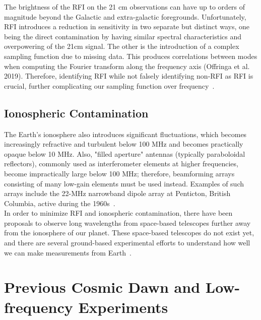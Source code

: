 \documentclass[12pt,a4paper]{report}
\begin{document}
	The brightness of the RFI on the 21 cm observations can have up to orders of magnitude beyond the Galactic and extra-galactic foregrounds. Unfortunately, RFI introduces a reduction in sensitivity in two separate but distinct ways, one being the direct contamination by having similar spectral characteristics and overpowering of the 21cm signal. The other is the introduction of a complex sampling function due to missing data. This produces correlations between modes when computing the Fourier transform along the frequency axis (Offringa et al. 2019). Therefore,  identifying RFI while not falsely identifying non-RFI as RFI is crucial, further complicating our sampling function over frequency~\citep{2019MNRAS.488.2605K}.
		
	\subsection*{Ionospheric Contamination}
	
	The Earth's ionosphere also introduces significant fluctuations, which becomes increasingly refractive and turbulent below 100 MHz and becomes practically opaque below 10 MHz. Also, "filled aperture" antennas (typically paraboloidal reflectors), commonly used as interferometer elements at higher frequencies, become impractically large below 100 MHz; therefore, beamforming arrays consisting of many low-gain elements must be used instead. Examples of such arrays include the 22-MHz narrowband dipole array at Penticton, British Columbia, active during the 1960s~\citep{2005ITAP...53.2480E}.\\
	
	
	In order to minimize RFI and ionospheric contamination, there have been proposals to observe long wavelengths from space-based telescopes further away from the ionosphere of our planet. These space-based telescopes do not exist yet, and there are several ground-based experimental efforts to understand how well we can make measurements from Earth~\citep{2016ExA....41..271R}. \\
	
	

	\section{Previous Cosmic Dawn and Low-frequency Experiments}
	
\end{document}
